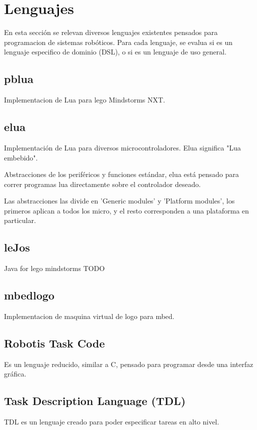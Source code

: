 
\section{Lenguajes}

En esta sección se relevan diversos lenguajes existentes pensados para
programacion de sistemas robóticos.
Para cada lenguaje, se evalua si es un lenguaje especifico
de dominio (DSL), o si es un lenguaje de uso general.

\subsection{pblua}

Implementacion de Lua para lego Mindstorms NXT.

\subsection{elua}

Implementación de Lua para diversos microcontroladores.
Elua significa "Lua embebido".

Abstracciones de los periféricos y funciones estándar, elua está pensado para
correr programas lua directamente sobre el controlador deseado.

Las abstracciones las divide en 'Generic modules' y 'Platform modules', 
los primeros aplican a todos los micro, y el resto corresponden a una
plataforma en particular.

\subsection{leJos}

Java for lego mindstorms
TODO

\subsection{mbedlogo}

Implementacion de maquina virtual de logo para mbed.

\subsection{Robotis Task Code}

Es un lenguaje reducido, similar a C, pensado para programar desde una
interfaz gráfica.

\subsection{Task Description Language (TDL)}

TDL es un lenguaje creado para poder especificar tareas en alto nivel.


